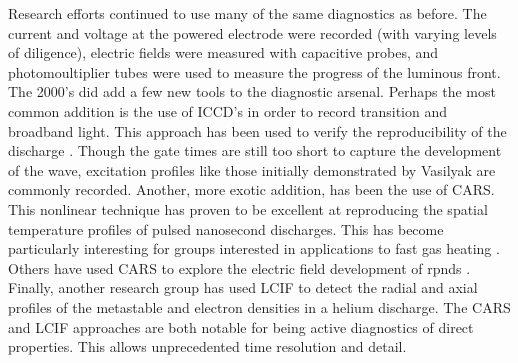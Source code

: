 Research efforts continued to use many of the same diagnostics as before. The
current and voltage at the powered electrode were recorded (with varying levels
of diligence), electric fields were measured with capacitive probes, and
photomoultiplier tubes were used to measure the progress of the luminous front.
The 2000's did add a few new tools to the diagnostic arsenal. Perhaps the most
common addition is the use of ICCD's in order to record transition and broadband
light. This approach has been used to verify the reproducibility of the
discharge \cite{Adamovich2009}. Though the gate times are still too short to
capture the development of the wave, excitation profiles like those initially
demonstrated by Vasilyak\cite{Vasilyak1994} are commonly recorded. Another, more
exotic addition, has been the use of CARS. This nonlinear technique has proven
to be excellent at reproducing the spatial temperature profiles of pulsed
nanosecond discharges. This has become particularly interesting for groups
interested in applications to fast gas heating \cite{Zuzeek2010}. Others have
used CARS to explore the electric field development of rpnds \cite{Ito2010,
Ito2010a}. Finally, another research group has used LCIF to detect the radial
and axial profiles of the metastable and electron densities in a helium
discharge. The CARS and LCIF approaches are both notable for being active
diagnostics of direct properties. This allows unprecedented time resolution and
detail.



